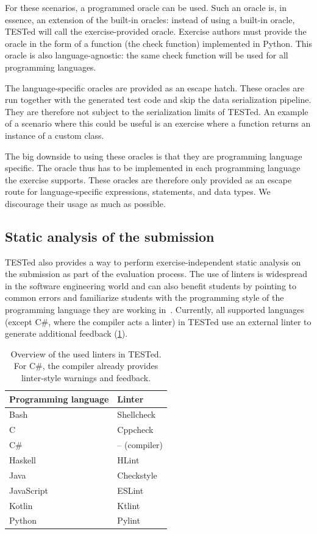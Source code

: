 \documentclass[../main]{subfiles}
\begin{document}
For these scenarios, a programmed oracle can be used.
Such an oracle is, in essence, an extension of the built-in oracles: instead of using a built-in oracle, TESTed will call the exercise-provided oracle.
Exercise authors must provide the oracle in the form of a function (the check function) implemented in Python.
This oracle is also language-agnostic: the same check function will be used for all programming languages.

The language-specific oracles are provided as an escape hatch.
These oracles are run together with the generated test code and skip the data serialization pipeline.
They are therefore not subject to the serialization limits of TESTed.
An example of a scenario where this could be useful is an exercise where a function returns an instance of a custom class.

The big downside to using these oracles is that they are programming language specific.
The oracle thus has to be implemented in each programming language the exercise supports.
These oracles are therefore only provided as an escape route for language-specific expressions, statements, and data types.
We discourage their usage as much as possible.

\subsection{Static analysis of the submission}\label{subsec:static-analysis-of-the-submission}

TESTed also provides a way to perform exercise-independent static analysis on the submission as part of the evaluation process.
The use of linters is widespread in the software engineering world and can also benefit students by pointing to common errors and familiarize students with the programming style of the programming language they are working in~\autocite{alomarUseStaticAnalysis2023}.
Currently, all supported languages (except C\#, where the compiler acts a linter) in TESTed use an external linter to generate additional feedback (\cref{tab:linters}).

\begin{table}[h]
    \centering
    \caption{
        Overview of the used linters in TESTed.
        For C\#, the compiler already provides linter-style warnings and feedback.
    }
    \label{tab:linters}
    \begin{tabular}{|l|l|}
        \hline
        Programming language & Linter \\
        \hline
        Bash & Shellcheck  \\
        C & Cppcheck \\
        C\# & -- (compiler) \\
        Haskell & HLint \\
        Java & Checkstyle \\
        JavaScript & ESLint \\
        Kotlin & Ktlint \\
        Python & Pylint \\
        \hline
    \end{tabular}
\end{table}
\end{document}
